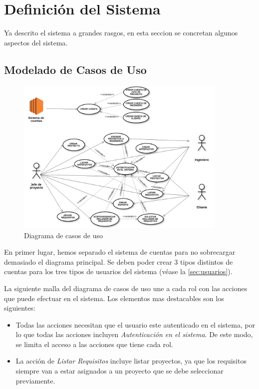 \documentclass[a4paper, spanish]{article}
\begin{document}
\section{Definición del Sistema}
Ya descrito el sistema a grandes rasgos, en esta seccion se concretan algunos
aspectos del sistema.

\subsection{Modelado de Casos de Uso}
\begin{figure}[h]
\centering
\includegraphics[width=0.9\textwidth]{diagramas/diagrama-casos-uso.png}
\caption{Diagrama de casos de uso}\label{fig:casosdeuso}
\end{figure}
En primer lugar, hemos separado el sistema de cuentas para no sobrecargar
demasiado el diagrama principal.
Se deben poder crear 3 tipos distintos de cuentas para los tres tipos de usuarios 
del sistema (véase la \autoref{sec:usuarios}).

La siguiente malla del diagrama de casos de uso une a cada rol con las acciones
que puede efectuar en el sistema. Los elementos mas destacables son los siguientes:
\begin{itemize}
  \item Todas las acciones necesitan que el usuario este autenticado en el sistema, por lo que todas las acciones incluyen \textit{Autenticación en el sistema}.
  De este modo, se limita el acceso a las acciones que tiene cada rol.
  \item La acción de \textit{Listar Requisitos} incluye listar proyectos, ya que los requisitos siempre van a estar asignados a un proyecto que se debe seleccionar previamente.
\end{itemize}
\end{document}
